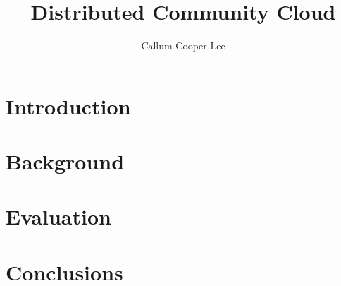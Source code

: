 \documentclass{mpaper}
\begin{document}
\title{Distributed Community Cloud}
\author{Callum Cooper Lee}

\maketitle

\begin{abstract}

\end{abstract}

\section{Introduction}

\section{Background}

\section{Evaluation}

\section{Conclusions}



\end{document}
